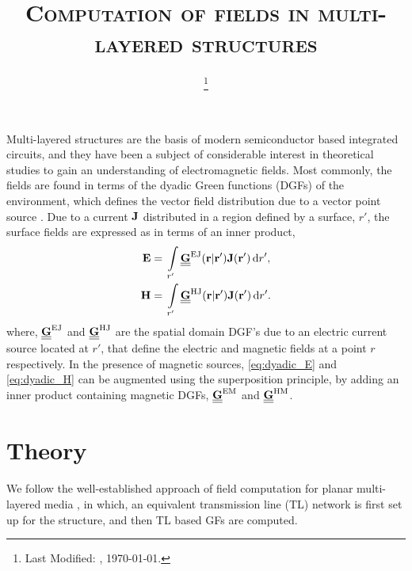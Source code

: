 \documentclass[12pt]{article}
\begin{document}
\title{\textsc{Computation of fields in multi-layered structures}}

\date{\footnote{Last Modified: \currenttime, \today.}}

\maketitle

Multi-layered structures are the basis of modern semiconductor based integrated circuits, and they have been a subject of considerable interest in theoretical studies to gain an understanding of electromagnetic fields. Most commonly, the fields are found in terms of the dyadic Green functions (DGFs) of the environment, which defines the vector field distribution due to a vector point source \cite{van2007electromagnetic}. Due to a current $\mathbf{J}$ distributed in a region defined by a surface, $r'$, the surface fields are expressed as in terms of an inner product,
%
\begin{subequations}
  \begin{align}
    \mathbf{E} ={}& \int\limits_{r'} \underline{\underline{\mathbf{G}}}^\mathrm{EJ}(\mathbf{r} | \mathbf{r'}) \mathbf{J}(\mathbf{r'}) \mathop{}\!\mathrm{d}{r'},
    \label{eq:dyadic_E}\\
    \mathbf{H} ={}& \int\limits_{r'} \underline{\underline{\mathbf{G}}}^\mathrm{HJ}(\mathbf{r} | \mathbf{r'}) \mathbf{J}(\mathbf{r'}) \mathop{}\!\mathrm{d}{r'}.
    \label{eq:dyadic_H}
  \end{align}
  \label{eq:dyadic}%
\end{subequations}
where, $\underline{\underline{\mathbf{G}}}^\mathrm{EJ}$ and $\underline{\underline{\mathbf{G}}}^\mathrm{HJ}$ are the spatial domain DGF's due to an electric current source located at $r'$, that define the electric and magnetic fields at a point $r$ respectively. In the presence of magnetic sources, \eqref{eq:dyadic_E} and \eqref{eq:dyadic_H} can be augmented using the superposition principle, by adding an inner product containing magnetic DGFs, $\underline{\underline{\mathbf{G}}}^\mathrm{EM}$ and
$\underline{\underline{\mathbf{G}}}^\mathrm{HM}$.
\section{Theory}
%
We follow the well-established approach of field computation for planar multi-layered media \cite{Michalski2005,Michalski1997}, in which, an equivalent transmission line (TL) network is first set up for the structure, and then TL based GFs are computed.
\end{document}
